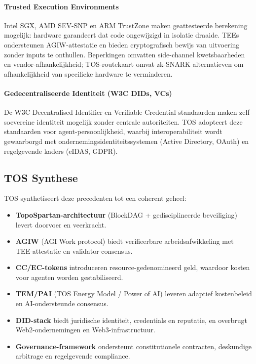 \documentclass[11pt]{article}
\begin{document}
\paragraph{Trusted Execution Environments} Intel SGX, AMD SEV-SNP en ARM TrustZone maken geattesteerde berekening mogelijk: hardware garandeert dat code ongewijzigd in isolatie draaide. TEEs ondersteunen AGIW-attestatie en bieden cryptografisch bewijs van uitvoering zonder inputs te onthullen. Beperkingen omvatten side-channel kwetsbaarheden en vendor-afhankelijkheid; TOS-routekaart omvat zk-SNARK alternatieven om afhankelijkheid van specifieke hardware te verminderen.

\paragraph{Gedecentraliseerde Identiteit (W3C DIDs, VCs)} De W3C Decentralised Identifier en Verifiable Credential standaarden maken zelf-soevereine identiteit mogelijk zonder centrale autoriteiten. TOS adopteert deze standaarden voor agent-persoonlijkheid, waarbij interoperabiliteit wordt gewaarborgd met ondernemingsidentiteitssystemen (Active Directory, OAuth) en regelgevende kaders (eIDAS, GDPR).

\subsection{TOS Synthese}
TOS synthetiseert deze precedenten tot een coherent geheel:
\begin{itemize}[noitemsep]
  \item \textbf{TopoSpartan-architectuur} (BlockDAG + gedisciplineerde beveiliging) levert doorvoer en veerkracht.
  \item \textbf{AGIW} (AGI Work protocol) biedt verifieerbare arbeidsafwikkeling met TEE-attestatie en validator-consensus.
  \item \textbf{CC/EC-tokens} introduceren resource-gedenomineerd geld, waardoor kosten voor agenten worden gestabiliseerd.
  \item \textbf{TEM/PAI} (TOS Energy Model / Power of AI) leveren adaptief kostenbeleid en AI-ondersteunde consensus.
  \item \textbf{DID-stack} biedt juridische identiteit, credentials en reputatie, en overbrugt Web2-ondernemingen en Web3-infrastructuur.
  \item \textbf{Governance-framework} ondersteunt constitutionele contracten, deskundige arbitrage en regelgevende compliance.
\end{itemize}
\end{document}
